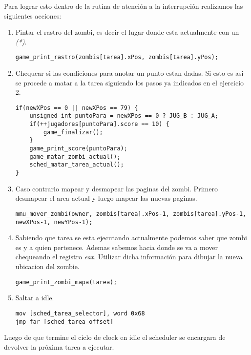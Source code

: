 	Para lograr esto dentro de la rutina de atención a la interrupción realizamos las siguientes acciones:

    \lstset{escapechar=@,style=c}
	\begin{enumerate}
		\item Pintar el rastro del zombi, es decir el lugar donde esta actualmente con un \textit{(*)}.
\begin{lstlisting}
game_print_rastro(zombis[tarea].xPos, zombis[tarea].yPos);
\end{lstlisting}



		\item Chequear si las condiciones para anotar un punto estan dadas. Si esto es asi se procede a matar a la tarea siguiendo los pasos ya indicados en el ejercicio 2.
\begin{lstlisting}
if(newXPos == 0 || newXPos == 79) {
    unsigned int puntoPara = newXPos == 0 ? JUG_B : JUG_A;
    if(++jugadores[puntoPara].score == 10) {
        game_finalizar();
    }
    game_print_score(puntoPara);
    game_matar_zombi_actual();
    sched_matar_tarea_actual();
}
\end{lstlisting}

		\item Caso contrario mapear y desmapear las paginas del zombi. Primero desmapear el area actual y luego mapear las nuevas paginas.
\begin{lstlisting}
mmu_mover_zombi(owner, zombis[tarea].xPos-1, zombis[tarea].yPos-1, newXPos-1, newYPos-1);
\end{lstlisting}

        \item Sabiendo que tarea se esta ejecutando actualmente podemos saber que zombi es y a quien pertenece. Ademas sabemos hacia donde se va a mover chequeando el registro \textit{eax}. Utilizar dicha información para dibujar la nueva ubicacion del zombie.
\begin{lstlisting}
game_print_zombi_mapa(tarea);
\end{lstlisting}

		\item Saltar a idle.
\begin{lstlisting}
mov [sched_tarea_selector], word 0x68
jmp far [sched_tarea_offset]
\end{lstlisting}        
	\end{enumerate}

	Luego de que termine el ciclo de clock en idle el scheduler se encargara de devolver la próxima tarea a ejecutar.


